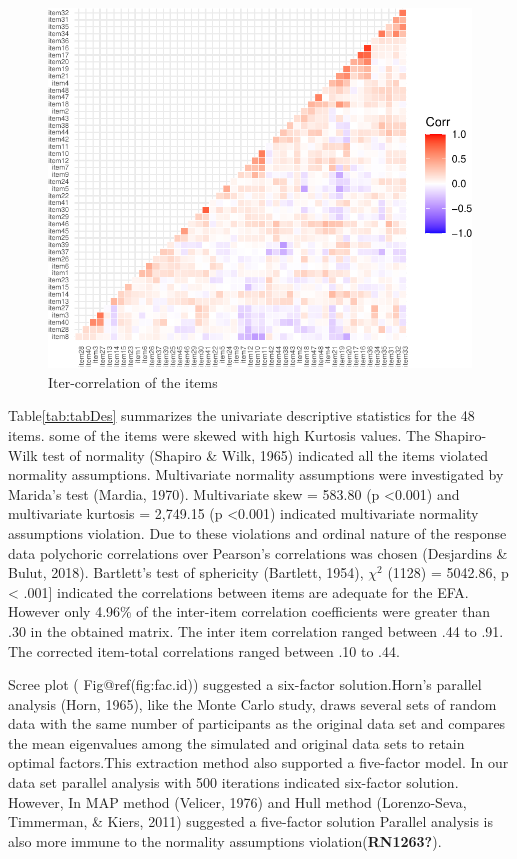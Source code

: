\documentclass[
  english,
  man]{apa6}
\begin{document}
\begin{figure}
\includegraphics[width=0.5\linewidth]{manuscript_files/figure-latex/figCor-1} \caption{Iter-correlation of the items}\label{fig:figCor}
\end{figure}

Table\ref{tab:tabDes} summarizes the univariate descriptive statistics for the 48 items. some of the items were skewed with high Kurtosis values. The Shapiro-Wilk test of normality (Shapiro \& Wilk, 1965) indicated all the items violated normality assumptions. Multivariate normality assumptions were investigated by Marida's test (Mardia, 1970). Multivariate skew = 583.80 (p \textless0.001) and multivariate kurtosis = 2,749.15 (p \textless0.001) indicated multivariate normality assumptions violation. Due to these violations and ordinal nature of the response data polychoric correlations over Pearson's correlations was chosen (Desjardins \& Bulut, 2018). Bartlett's test of sphericity (Bartlett, 1954), \(\chi^2\) (1128) = 5042.86, p \textless{} .001{]} indicated the correlations between items are adequate for the EFA. However only 4.96\% of the inter-item correlation coefficients were greater than .30 in the obtained matrix. The inter item correlation ranged between .44 to .91. The corrected item-total correlations ranged between .10 to .44.

Scree plot ( Fig@ref(fig:fac.id)) suggested a six-factor solution.Horn's parallel analysis (Horn, 1965), like the Monte Carlo study, draws several sets of random data with the same number of participants as the original data set and compares the mean eigenvalues among the simulated and original data sets to retain optimal factors.This extraction method also supported a five-factor model. In our data set parallel analysis with 500 iterations indicated six-factor solution. However, In MAP method (Velicer, 1976) and Hull method (Lorenzo-Seva, Timmerman, \& Kiers, 2011) suggested a five-factor solution Parallel analysis is also more immune to the normality assumptions violation(\textbf{RN1263?}).
\end{document}

